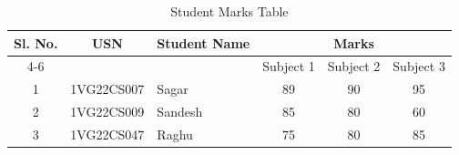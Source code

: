 \documentclass{book}
\begin{document}
\begin{table}[h]
\centering
\begin{tabular}{|c|c|l|c|c|c|}
\hline
\multirow{2}{*}{Sl. No.} &
\multirow{2}{*}{USN} &
\multirow{2}{*}{Student Name} &
\multicolumn{3}{c|}{Marks} \\ \cline{4-6}
& & & Subject 1 & Subject 2 & Subject 3 \\ \hline
1 & 1VG22CS007 & Sagar   & 89 & 90 & 95 \\ \hline
2 & 1VG22CS009 & Sandesh & 85 & 80 & 60 \\ \hline
3 & 1VG22CS047 & Raghu   & 75 & 80 & 85 \\ \hline
\end{tabular}
\caption{Student Marks Table}
\end{table}
\end{document}
